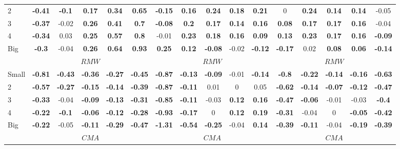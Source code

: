 \begin{table}[H]
\begin{tabular}{lccccc|ccccc|ccccc}
2 & \textbf{-0.41} & \textbf{-0.1} & \textbf{0.17} & \textbf{0.34} & \textbf{0.65} & \textbf{-0.15} & \textbf{0.16} & \textbf{0.24} & \textbf{0.18} & \textbf{0.21} & 0 & \textbf{0.24} & \textbf{0.14} & \textbf{0.14} & -0.05 \\
3 & \textbf{-0.37} & -0.02 & \textbf{0.26} & \textbf{0.41} & \textbf{0.7} & \textbf{-0.08} & \textbf{0.2} & \textbf{0.17} & \textbf{0.14} & \textbf{0.16} & \textbf{0.08} & \textbf{0.17} & \textbf{0.17} & \textbf{0.16} & -0.04 \\
4 & \textbf{-0.34} & 0.03 & \textbf{0.25} & \textbf{0.57} & \textbf{0.8} & -0.01 & \textbf{0.23} & \textbf{0.18} & \textbf{0.16} & \textbf{0.09} & \textbf{0.13} & \textbf{0.23} & \textbf{0.17} & \textbf{0.16} & \textbf{-0.09} \\
Big & \textbf{-0.3} & -0.04 & \textbf{0.26} & \textbf{0.64} & \textbf{0.93} & \textbf{0.25} & \textbf{0.12} & \textbf{-0.08} & -0.02 & \textbf{-0.12} & \textbf{-0.17} & 0.02 & \textbf{0.08} & \textbf{0.06} & \textbf{-0.14} \\
 & \multicolumn{5}{c|}{$RMW$} & \multicolumn{5}{c|}{$RMW$} & \multicolumn{5}{c}{$RMW$} \\
Small & \textbf{-0.81} & \textbf{-0.43} & \textbf{-0.36} & \textbf{-0.27} & \textbf{-0.45} & \textbf{-0.87} & \textbf{-0.13} & \textbf{-0.09} & -0.01 & \textbf{-0.14} & \textbf{-0.8} & \textbf{-0.22} & \textbf{-0.14} & \textbf{-0.16} & \textbf{-0.63} \\
2 & \textbf{-0.57} & \textbf{-0.27} & \textbf{-0.15} & \textbf{-0.14} & \textbf{-0.39} & \textbf{-0.87} & \textbf{-0.11} & 0.01 & 0 & 0.05 & \textbf{-0.62} & \textbf{-0.14} & \textbf{-0.07} & \textbf{-0.12} & \textbf{-0.47} \\
3 & \textbf{-0.33} & -0.04 & \textbf{-0.09} & \textbf{-0.13} & \textbf{-0.31} & \textbf{-0.85} & \textbf{-0.11} & -0.03 & \textbf{0.12} & \textbf{0.16} & \textbf{-0.47} & \textbf{-0.06} & -0.01 & -0.03 & \textbf{-0.4} \\
4 & \textbf{-0.22} & \textbf{-0.1} & \textbf{-0.06} & \textbf{-0.12} & \textbf{-0.28} & \textbf{-0.93} & \textbf{-0.17} & 0 & \textbf{0.12} & \textbf{0.19} & \textbf{-0.31} & -0.04 & 0 & \textbf{-0.05} & \textbf{-0.42} \\
Big & \textbf{-0.22} & -0.05 & \textbf{-0.11} & \textbf{-0.29} & \textbf{-0.47} & \textbf{-1.31} & \textbf{-0.54} & \textbf{-0.25} & -0.04 & \textbf{0.14} & \textbf{-0.39} & \textbf{-0.11} & -0.04 & \textbf{-0.19} & \textbf{-0.39} \\
 & \multicolumn{5}{c|}{$CMA$} & \multicolumn{5}{c|}{$CMA$} & \multicolumn{5}{c}{$CMA$} \\

\end{tabular}
\end{table}
